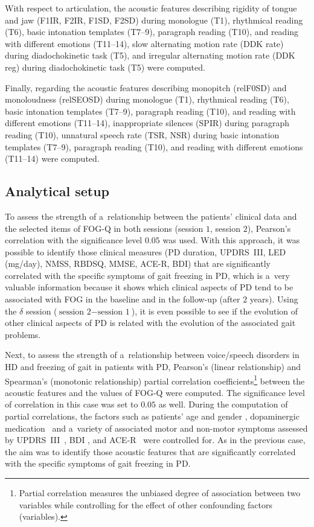 With respect to articulation, the acoustic features describing rigidity of tongue and jaw (F1IR, F2IR, F1SD, F2SD) during monologue (T1), rhythmical reading (T6), basic intonation templates (T7--9), paragraph reading (T10), and reading with different emotions (T11--14), slow alternating motion rate (DDK rate) during diadochokinetic task (T5), and irregular alternating motion rate (DDK reg) during diadochokinetic task (T5) were computed.

Finally, regarding the acoustic features describing monopitch (relF0SD) and monoloudness (relSEOSD) during monologue (T1), rhythmical reading (T6), basic intonation templates (T7--9), paragraph reading (T10), and reading with different emotions (T11--14), inappropriate silences (SPIR) during paragraph reading (T10), unnatural speech rate (TSR, NSR) during basic intonation templates (T7--9), paragraph reading (T10), and reading with different emotions (T11--14) were computed.

\subsection{Analytical setup}
\label{ch6_3_3}

To assess the strength of a~relationship between the patients' clinical data and the selected items of FOG-Q in both sessions (session $1$, session $2$), Pearson's correlation with the significance level $0.05$ was used. With this approach, it was possible to identify those clinical measures (PD duration, UPDRS~III, LED (mg/day), NMSS, RBDSQ, MMSE, ACE-R, BDI) that are significantly correlated with the specific symptoms of gait freezing in PD, which is a~very valuable information because it shows which clinical aspects of PD tend to be associated with FOG in the baseline and in the follow-up (after $2$ years). Using the $\delta$ session ($\mbox{session 2} - \mbox{session 1}$), it is even possible to see if the evolution of other clinical aspects of PD is related with the evolution of the associated gait problems.

Next, to assess the strength of a~relationship between voice/speech disorders in HD and freezing of gait in patients with PD, Pearson's (linear relationship) and Spearman's (monotonic relationship) partial correlation coefficients\footnote{Partial correlation measures the unbiased degree of association between two variables while controlling for the effect of other confounding factors (variables).} between the acoustic features and the values of FOG-Q were computed. The significance level of correlation in this case was set to $0.05$ as well. During the computation of partial correlations, the factors such as patients' age and gender \cite{Skodda2011d, Vergara2017}, dopaminergic medication~\cite{Lee2010} and a~variety of associated motor and non-motor symptoms assessed by UPDRS~III~\cite{Fahn1987}, BDI \cite{Beck2000, Beck1961}, and ACE-R~\cite{Larner2007} were controlled for. As in the previous case, the aim was to identify those acoustic features that are significantly correlated with the specific symptoms of gait freezing in PD.

